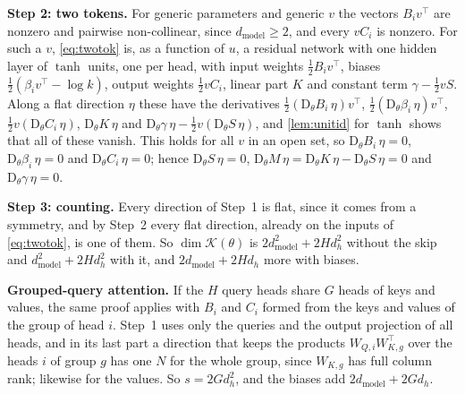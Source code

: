 \documentclass[10pt]{article}
\theoremstyle{definition}
\theoremstyle{remark}
\newcommand{\dm}{d_{\mathrm{model}}}
\newcommand{\Der}{\mathrm{D}}
\newcommand{\para}[1]{\smallskip\noindent\textbf{#1}\hspace{0.5em}}
\begin{document}
\para{Step 2: two tokens.} For generic parameters and generic $v$ the vectors $B_iv^\top$ are nonzero and pairwise non-collinear, since $\dm \ge 2$, and every $vC_i$ is nonzero. For such a $v$, \cref{eq:twotok} is, as a function of $u$, a residual network with one hidden layer of $\tanh$ units, one per head, with input weights $\tfrac12B_iv^\top$, biases $\tfrac12(\beta_iv^\top - \log k)$, output weights $\tfrac12vC_i$, linear part $K$ and constant term $\gamma - \tfrac12vS$. Along a flat direction $\eta$ these have the derivatives $\tfrac12(\Der_\theta B_i\,\eta)v^\top$, $\tfrac12(\Der_\theta\beta_i\,\eta)v^\top$, $\tfrac12v(\Der_\theta C_i\,\eta)$, $\Der_\theta K\,\eta$ and $\Der_\theta\gamma\,\eta - \tfrac12v(\Der_\theta S\,\eta)$, and \cref{lem:unitid} for $\tanh$ shows that all of these vanish. This holds for all $v$ in an open set, so $\Der_\theta B_i\,\eta = 0$, $\Der_\theta\beta_i\,\eta = 0$ and $\Der_\theta C_i\,\eta = 0$; hence $\Der_\theta S\,\eta = 0$, $\Der_\theta M\,\eta = \Der_\theta K\,\eta - \Der_\theta S\,\eta = 0$ and $\Der_\theta\gamma\,\eta = 0$.

\para{Step 3: counting.} Every direction of Step~1 is flat, since it comes from a symmetry, and by Step~2 every flat direction, already on the inputs of \cref{eq:twotok}, is one of them. So $\dim\mathcal K(\theta)$ is $2\dm^2 + 2Hd_h^2$ without the skip and $\dm^2 + 2Hd_h^2$ with it, and $2\dm + 2Hd_h$ more with biases.

\para{Grouped-query attention.} If the $H$ query heads share $G$ heads of keys and values, the same proof applies with $B_i$ and $C_i$ formed from the keys and values of the group of head $i$. Step~1 uses only the queries and the output projection of all heads, and in its last part a direction that keeps the products $W_{Q,i}W_{K,g}^\top$ over the heads $i$ of group $g$ has one $N$ for the whole group, since $W_{K,g}$ has full column rank; likewise for the values. So $s = 2Gd_h^2$, and the biases add $2\dm + 2Gd_h$.
\end{document}
